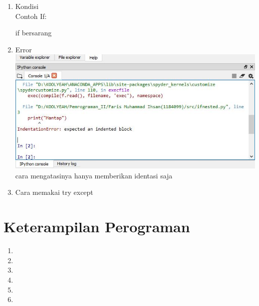 \begin{enumerate}
\begin{enumerate}[label=\alph*.]
\item Kondisi\\
Contoh If:


if bersarang\\


\item Error\\
\includegraphics{gambar/errsyntax.jpg}
cara mengatasinya hanya memberikan identasi saja

\item Cara memakai try except\\


\end{enumerate}

\section{Keterampilan Perograman}

\begin{enumerate}

\item


\item


\item


\item


\item


\item



\end{enumerate}
\end{enumerate}
